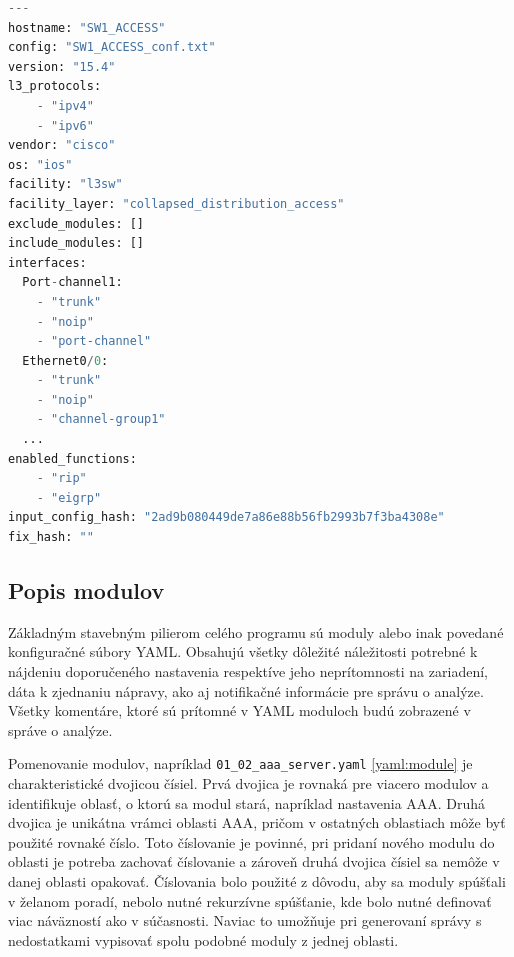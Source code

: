 \newpage
\begin{lstlisting}[frame=single,numbers=right,caption={Konfiguračný súbor \texttt{device\_info.yaml}, ktorý popisuje základné informácie o~jednom konkrétnom zariadení},label=yaml:device_info,basicstyle=\ttfamily\small\linespread{0.8}, keywordstyle=\color{black},language=python,breaklines=true]
---
hostname: "SW1_ACCESS"
config: "SW1_ACCESS_conf.txt" 
version: "15.4" 
l3_protocols:
	- "ipv4"
	- "ipv6"
vendor: "cisco"
os: "ios" 
facility: "l3sw" 
facility_layer: "collapsed_distribution_access" 
exclude_modules: []
include_modules: []
interfaces:
  Port-channel1:
	- "trunk"
	- "noip"
	- "port-channel"
  Ethernet0/0:
	- "trunk"
	- "noip"
	- "channel-group1"
  ...  
enabled_functions:
	- "rip"
	- "eigrp"
input_config_hash: "2ad9b080449de7a86e88b56fb2993b7f3ba4308e"
fix_hash: ""

\end{lstlisting}

 \newpage

\subsection{Popis modulov}
\label{module}
Základným stavebným pilierom celého programu sú moduly alebo inak povedané konfiguračné súbory YAML. Obsahujú všetky dôležité náležitosti potrebné k nájdeniu doporučeného nastavenia respektíve jeho neprítomnosti na zariadení, dáta k zjednaniu nápravy, ako aj notifikačné informácie pre správu o analýze. Všetky komentáre, ktoré sú prítomné v YAML moduloch budú zobrazené v správe o analýze.

Pomenovanie modulov, napríklad \texttt{01\_02\_aaa\_server.yaml} \ref{yaml:module} je charakteristické dvojicou čísiel. Prvá dvojica je rovnaká pre viacero modulov a identifikuje oblasť, o ktorú sa modul stará, napríklad nastavenia AAA. Druhá dvojica je unikátna vrámci oblasti AAA, pričom v ostatných oblastiach môže byť použité rovnaké číslo. Toto číslovanie je povinné, pri pridaní nového modulu do oblasti je potreba zachovať číslovanie a zároveň druhá dvojica čísiel sa nemôže v danej oblasti opakovať. Číslovania bolo použité z dôvodu, aby sa moduly spúšťali v želanom poradí, nebolo nutné rekurzívne spúšťanie, kde bolo nutné definovať viac náväzností ako v súčasnosti. Naviac to umožňuje pri generovaní správy s nedostatkami vypisovať spolu podobné moduly z jednej oblasti.\\  


